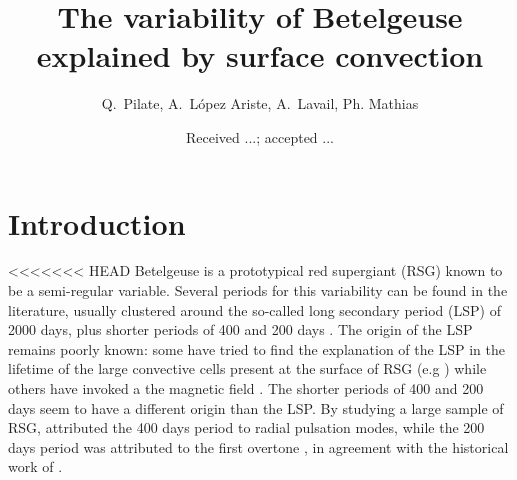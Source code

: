 \documentclass{aa}
\begin{document}
 


   \title{The variability  of Betelgeuse explained by surface convection}


    \author{{ Q.~Pilate},{ A.~L{\'o}pez Ariste},{ A.~Lavail},{ Ph. Mathias} }


   \date{Received ...; accepted ...}

 
  \abstract


   \keywords{
               }

   \maketitle
%

\section{Introduction}
<<<<<<< HEAD
Betelgeuse is a prototypical red supergiant (RSG) known to be a semi-regular variable. Several periods for this variability can be found in the 
literature, usually clustered around the so-called long secondary period (LSP) of 2000 days, plus shorter periods of 400 and 200 days \citep{kiss_variability_2006}. 
The origin of the LSP remains poorly known: some have tried to find the explanation of  the LSP in the lifetime of the large convective cells present at the surface of RSG (e.g \cite{stothers_giant_2010}) while others have invoked a the magnetic field \citep{wood_long_2004}. 
The shorter periods of 400 and 200 days seem to have a different origin than the LSP. By studying a large sample of 
RSG, \cite{kiss_variability_2006} attributed the 400 days period to radial pulsation modes, while the 200 days period was attributed to the first overtone \citep{joyce_standing_2020}, 
 in agreement with the historical work of \cite{stothers_pulsation_1969}.\\
\end{document}
